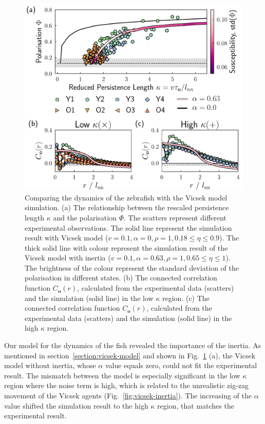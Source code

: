 \documentclass[11pt,twoside]{report}
\begin{document}
\begin{figure}
  \includegraphics[width=\linewidth]{model-dynamics}
  \caption[Comparing the dynamics of the zebrafish with the Vicsek model simulation]{
  Comparing the dynamics of the zebrafish with the Vicsek model simulation.
  (a) The relationship between the rescaled persistence length $\kappa$ and the polarisation $\Phi$. The scatters represent different experimental observations. The solid line represent the simulation result with Vicsek model ($v=0.1, \alpha=0, \rho=1, 0.18 \le \eta \le 0.9$). The thick solid line with colour represent the simulation result of the Vicsek model with inertia ($v=0.1, \alpha=0.63, \rho=1, 0.65 \le \eta \le 1$). The brightness of the colour represent the standard deviation of the polarisation in different states.
  (b) The connected correlation function $C_\mathbf{o}(r)$, calculated from the experimental data (scatters) and the simulation (solid line) in the low $\kappa$ region.
  (c) The connected correlation function $C_\mathbf{o}(r)$, calculated from the experimental data (scatters) and the simulation (solid line) in the high $\kappa$ region.
  }
  \label{fig:model-dynamics}
\end{figure}

Our model for the dynamics of the fish revealed the importance of the inertia. As mentioned in section~\ref{section:vicsek-model} and shown in Fig.~\ref{fig:model-dynamics} (a), the Vicsek model without inertia, whose $\alpha$ value equals zero, could not fit the experimental result. The mismatch between the model is especially significant in the low $\kappa$ region where the noise term is high, which is related to the unrealistic zig-zag movement of the Vicsek agents (Fig.~\ref{fig:vicsek-inertia}). The increasing of the $\alpha$ value shifted the simulation result to the high $\kappa$ region, that matches the experimental result.
\end{document}

